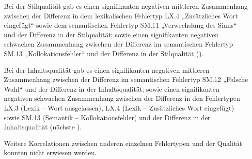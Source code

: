 Bei der Stilqualität gab es einen signifikanten negativen mittleren Zusammenhang zwischen der Differenz in dem lexikalischen Fehlertyp LX.4 „Zusätzliches Wort eingefügt“ sowie dem semantischen Fehlertyp SM.11 „Verwechslung des Sinns“ und der Differenz in der Stilqualität; sowie einen signifikanten negativen schwachen Zusammenhang zwischen der Differenz im semantischen Fehlertyp SM.13 „Kollokationsfehler“ und der Differenz in der Stilqualität ().

Bei der Inhaltsqualität gab es einen signifikanten negativen mittleren Zusammenhang zwischen der Differenz im semantischen Fehlertyp SM.12 „Falsche Wahl“ und der Differenz in der Inhaltsqualität; sowie einen signifikanten negativen schwachen Zusammenhang zwischen der Differenz in den Fehlertypen LX.3 (Lexik -- Wort ausgelassen), LX.4 (Lexik -- Zusätzliches Wort eingefügt) sowie SM.13 (Semantik -- Kollokationsfehler) und der Differenz in der Inhaltsqualität (nächste ).

Weitere Korrelationen zwischen anderen einzelnen Fehlertypen und der Qualität konnten nicht erwiesen werden.


